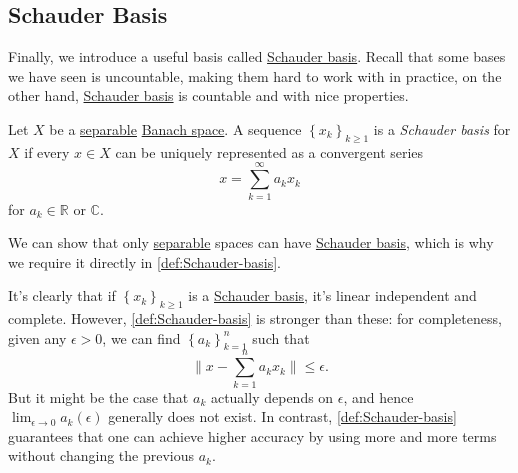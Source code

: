 \subsection{Schauder Basis}
Finally, we introduce a useful basis called \hyperref[def:Schauder-basis]{Schauder basis}. Recall that some bases we have seen is uncountable, making them hard to work with in practice, on the other hand, \hyperref[def:Schauder-basis]{Schauder basis} is countable and with nice properties.

\begin{definition}\label{def:Schauder-basis}
	Let \(X\) be a \hyperref[def:separable]{separable} \hyperref[def:Banach-space]{Banach space}. A sequence \(\left\{ x_k \right\} _{k\geq 1}\) is a \emph{Schauder basis} for \(X\) if every \(x\in X\) can be uniquely represented as a convergent series
	\[
		x = \sum_{k=1} ^{\infty} a_k x_k
	\]
	for \(a_k\in \mathbb{R} \) or \(\mathbb{C} \).
\end{definition}

\begin{remark}
	We can show that only \hyperref[def:separable]{separable} spaces can have \hyperref[def:Schauder-basis]{Schauder basis}, which is why we require it directly in \autoref{def:Schauder-basis}.
\end{remark}

It's clearly that if \(\left\{ x_k \right\} _{k\geq 1}\) is a \hyperref[def:Schauder-basis]{Schauder basis}, it's linear independent and complete. However, \autoref{def:Schauder-basis} is stronger than these: for completeness, given any \(\epsilon > 0\), we can find \(\left\{ a_k \right\} _{k=1}^n\) such that
\[
	\lVert x - \sum_{k=1}^n a_{k} x_{k} \rVert \leq \epsilon.
\]
But it might be the case that \(a_k\) actually depends on \(\epsilon \), and hence \(\lim_{\epsilon \to 0}a_k(\epsilon )\) generally does not exist. In contrast, \autoref{def:Schauder-basis} guarantees that one can achieve higher accuracy by using more and more terms without changing the previous \(a_k\).

